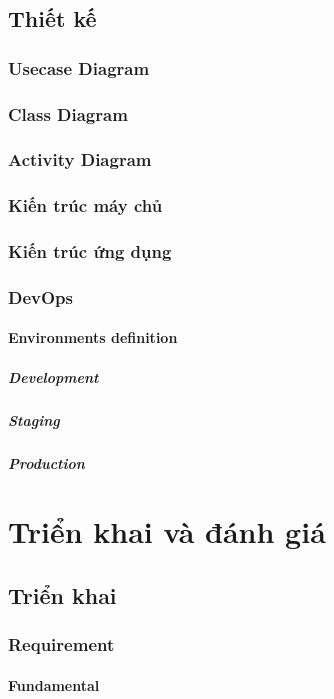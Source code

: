 \documentclass{report}
\begin{document}
\chapter{Thiết kế}
\section{Usecase Diagram}
\section{Class Diagram}
\section{Activity Diagram}
\section{Kiến trúc máy chủ}
\section{Kiến trúc ứng dụng}
\section{DevOps}
\subsection{Environments definition}
\subsubsection{Development}
\subsubsection{Staging}
\subsubsection{Production}
\part{Triển khai và đánh giá}
\chapter{Triển khai}
\section{Requirement}
\subsection{Fundamental}
\end{document}
